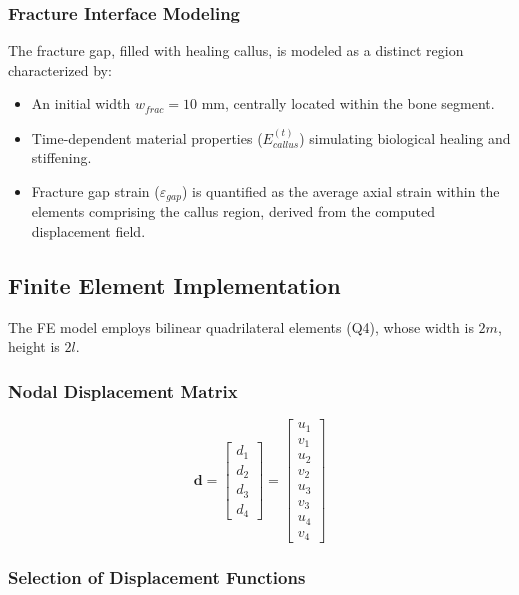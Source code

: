 \documentclass{article}
\begin{document}
\subsubsection{Fracture Interface Modeling}
The fracture gap, filled with healing callus, is modeled as a distinct region characterized by:
\begin{itemize}
  \item An initial width $w_{frac} = 10$ mm, centrally located within the bone segment.
  \item Time-dependent material properties ($E_{callus}^{(t)}$) simulating biological healing and stiffening.
  \item Fracture gap strain ($\varepsilon_{gap}$) is quantified as the average axial strain within the elements comprising the callus region, derived from the computed displacement field.
\end{itemize}

\subsection{Finite Element Implementation}

The FE model employs bilinear quadrilateral elements (Q4), whose width is $2m$, height is $2l$.

\subsubsection{Nodal Displacement Matrix}

\[
  \mathbf{d} = \begin{bmatrix}
    d_1 \\
    d_2 \\
    d_3 \\
    d_4
  \end{bmatrix} = \begin{bmatrix}
    u_1 \\
    v_1 \\
    u_2 \\
    v_2 \\
    u_3 \\
    v_3 \\
    u_4 \\
    v_4
  \end{bmatrix}
\]

\subsubsection{Selection of Displacement Functions}
\end{document}
